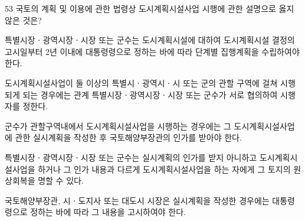 \begin{question}{53}
국토의 계획 및 이용에 관한 법령상 도시계획시설사업 시행에 관한 설명으로 옳지 않은 것은?
\begin{choices}
  \item 특별시장ㆍ광역시장ㆍ시장 또는 군수는 도시계획시설에 대하여 도시계획시설 결정의 고시일부터 2년 이내에 대통령령으로 정하는 바에 따라 단계별 집행계획을 수립하여야 한다.
  \item 도시계획시설사업이 둘 이상의 특별시ㆍ광역시ㆍ시 또는 군의 관할 구역에 걸쳐 시행되게 되는 경우에는 관계 특별시장ㆍ광역시장ㆍ시장 또는 군수가 서로 협의하여 시행자를 정한다.
  \item 군수가 관할구역내에서 도시계획시설사업을 시행하는 경우에는 그 도시계획시설사업에 관한 실시계획을 작성한 후 국토해양부장관의 인가를 받아야 한다.
  \item 특별시장ㆍ광역시장ㆍ시장 또는 군수는 실시계획의 인가를 받지 아니하고 도시계획시설사업을 하거나 그 인가 내용과 다르게 도시계획시설사업을 하는 자에게 그 토지의 원상회복을 명할 수 있다.
  \item 국토해양부장관, 시ㆍ도지사 또는 대도시 시장은 실시계획을 작성한 경우에는 대통령령으로 정하는 바에 따라 그 내용을 고시하여야 한다.
\end{choices}
\end{question}
